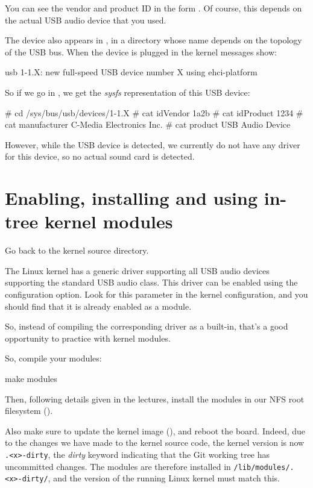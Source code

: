 You can see the vendor and product ID in the form .
Of course, this depends on the actual USB audio device
that you used.

The device also appears in , in a
directory whose name depends on the topology of the USB bus. When the
device is plugged in the kernel messages show:

\begin{bashinput}
usb 1-1.X: new full-speed USB device number X using ehci-platform
\end{bashinput}

So if we go in , we get the {\em
sysfs} representation of this USB device:

\begin{bashinput}
# cd /sys/bus/usb/devices/1-1.X
# cat idVendor
1a2b
# cat idProduct
1234
# cat manufacturer
C-Media Electronics Inc.
# cat product
USB Audio Device
\end{bashinput}

However, while the USB device is detected, we currently do not have
any driver for this device, so no actual sound card is detected.

\section{Enabling, installing and using in-tree kernel modules}

Go back to the kernel source directory.

The Linux kernel has a generic driver supporting all USB audio devices
supporting the standard USB audio class. This driver can be enabled
using the  configuration option. Look
for this parameter in the kernel configuration, and you should find
that it is already enabled as a module.

So, instead of compiling the corresponding driver as a built-in, that's
a good opportunity to practice with kernel modules.

So, compile your modules:
\begin{bashinput}
make modules
\end{bashinput}

Then, following details given in the lectures, install the modules in our NFS
root filesystem ().

Also make sure to update the kernel image (), and reboot the
board.  Indeed, due to the changes we have made to the kernel source code,
the kernel version is now {\tt \workingkernel.<x>-dirty}, the {\em dirty}
keyword indicating that the Git working tree has uncommitted changes.
The modules are therefore installed in {\tt /lib/modules/\workingkernel.<x>-dirty/},
and the version of the running Linux kernel must match this.

